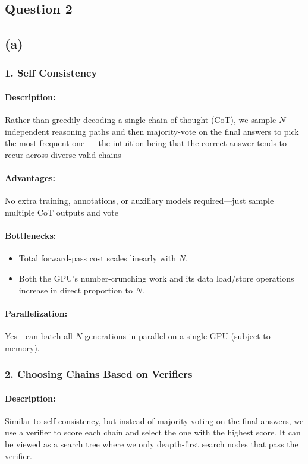 \documentclass[12pt]{article}
\begin{document}
\pagebreak

\subsection*{Question 2}
\subsection*{(a)}
\subsubsection*{1. Self Consistency}
\paragraph{Description:} 
Rather than greedily decoding a single chain-of-thought (CoT),
we sample $N$ independent reasoning paths and then majority-vote
on the final answers to pick the most frequent one — the intuition being that
the correct answer tends to recur across diverse valid chains

\paragraph{Advantages:}
No extra training, annotations, or auxiliary models required—just sample multiple CoT outputs and vote


\paragraph{Bottlenecks:}
\begin{itemize}
    \item Total forward-pass cost scales linearly with $N$.
    \item Both the GPU’s number-crunching work and its data load/store operations increase in direct proportion to $N$.
\end{itemize}

\paragraph{Parallelization:}
Yes—can batch all $N$ generations in parallel on a single GPU (subject to memory).

\subsubsection*{2. Choosing Chains Based on Verifiers}
\paragraph{Description:}
Similar to self-consistency, but instead of majority-voting on the final answers,
we use a verifier to score each chain and select the one with the highest score.
It can be viewed as a search tree where we only deapth-first search nodes that pass the verifier.
\end{document}
